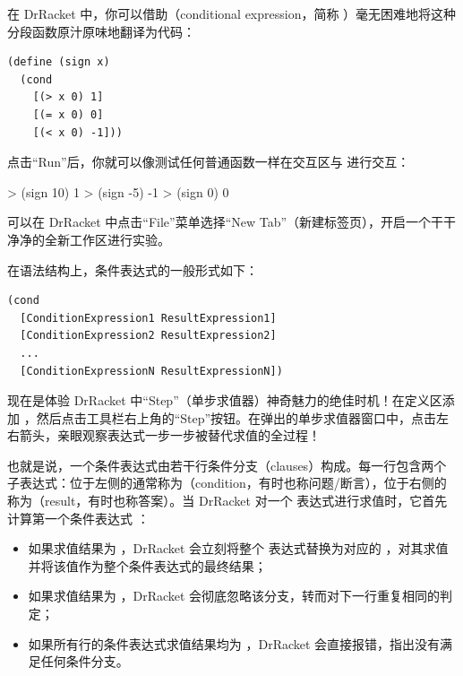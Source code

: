 在 DrRacket 中，你可以借助（conditional expression，简称 ）毫无困难地将这种分段函数原汁原味地翻译为代码：

\begin{lstlisting}[language=BSL]
(define (sign x)
  (cond
    [(> x 0) 1]
    [(= x 0) 0]
    [(< x 0) -1]))
\end{lstlisting}

点击“Run”后，你就可以像测试任何普通函数一样在交互区与  进行交互：
\begin{replbox}
> (sign 10)
1
> (sign -5)
-1
> (sign 0)
0
\end{replbox}

\begin{notebox}
可以在 DrRacket 中点击“File”菜单选择“New Tab”（新建标签页），开启一个干干净净的全新工作区进行实验。
\end{notebox}

在语法结构上，条件表达式的一般形式如下：
\begin{lstlisting}[language=BSL]
(cond
  [ConditionExpression1 ResultExpression1]
  [ConditionExpression2 ResultExpression2]
  ...
  [ConditionExpressionN ResultExpressionN])
\end{lstlisting}

\begin{notebox}[探索代数单步求值器]
现在是体验 DrRacket 中“Step”（单步求值器）神奇魅力的绝佳时机！在定义区添加 ，然后点击工具栏右上角的“Step”按钮。在弹出的单步求值器窗口中，点击左右箭头，亲眼观察表达式一步一步被替代求值的全过程！
\end{notebox}

也就是说，一个条件表达式由若干行条件分支（clauses）构成。每一行包含两个子表达式：位于左侧的通常称为（condition，有时也称问题/断言），位于右侧的称为（result，有时也称答案）。当 DrRacket 对一个  表达式进行求值时，它首先计算第一个条件表达式 ：
\begin{itemize}
  \item 如果求值结果为 ，DrRacket 会立刻将整个  表达式替换为对应的 ，对其求值并将该值作为整个条件表达式的最终结果；
  \item 如果求值结果为 ，DrRacket 会彻底忽略该分支，转而对下一行重复相同的判定；
  \item 如果所有行的条件表达式求值结果均为 ，DrRacket 会直接报错，指出没有满足任何条件分支。
\end{itemize}

